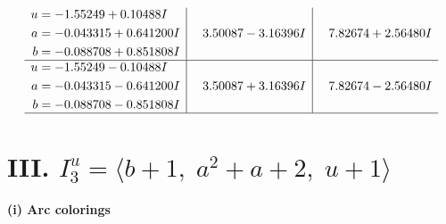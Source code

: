 \documentclass[1p]{elsarticle_modified}
\theoremstyle{definition}
\begin{document}
$$\begin{array}{c|c|c}
\begin{aligned}
u &= -1.55249 + 0.10488 I \\
a &= -0.043315 + 0.641200 I \\
b &= -0.088708 + 0.851808 I\end{aligned}
 & \phantom{-}3.50087 - 3.16396 I & \phantom{-}7.82674 + 2.56480 I \\ \hline\begin{aligned}
u &= -1.55249 - 0.10488 I \\
a &= -0.043315 - 0.641200 I \\
b &= -0.088708 - 0.851808 I\end{aligned}
 & \phantom{-}3.50087 + 3.16396 I & \phantom{-}7.82674 - 2.56480 I\\
 \hline 
 \end{array}$$\newpage\newpage\renewcommand{\arraystretch}{1}
\centering \section*{III. $I^u_{3}= \langle b+1,\;a^2+a+2,\;u+1 \rangle$}
\flushleft \textbf{(i) Arc colorings}\\
\end{document}
